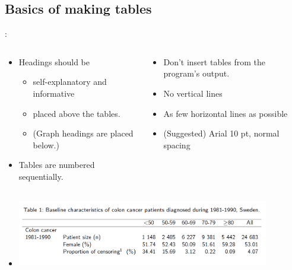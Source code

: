 \subsection{Basics of making tables}
\begin{frame}{\secname: \subsecname}

\begin{columns}[t]
\begin{column}{0.6\textwidth}	
	
\begin{itemize}
\item<1|handout:1-> Headings should be 
	\begin{itemize}
	\item self-explanatory and informative
	\item placed above the tables.
	\item (Graph headings  are placed below.)
	\end{itemize}
\item<2|handout:2-> Tables are numbered sequentially.
	\end{itemize}
	
\end{column}

\begin{column}{0.4\textwidth}	
\begin{itemize}
\item <3|handout:3-> Don't insert tables from the program's output.
\item <4|handout:4-> No vertical lines 
\item <4|handout:4-> As few horizontal lines as possible
\item <5|handout:5-> (Suggested) Arial 10 pt, normal spacing 
\end{itemize}
\end{column}
\end{columns}

\begin{itemize}
\item[]<6|handout:6>	
\begin{center}
		\includegraphics[width=11cm, height=3cm]{image/tab1}
\end{center}
\end{itemize}
\end{frame}
